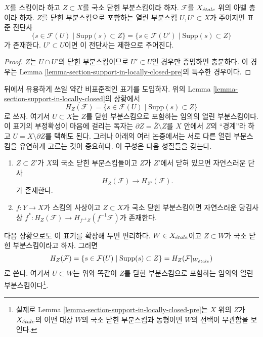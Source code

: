 \begin{lemma}
\label{lemma-section-support-in-locally-closed}
$X$를 스킴이라 하고 $Z \subset X$를 국소 닫힌 부분스킴이라 하자.
$\mathcal{F}$를 $X_{\acute{e}tale}$ 위의 아벨 층이라 하자. $Z$를 닫힌 부분스킴으로
포함하는 열린 부분스킴 $U, U' \subset X$가 주어지면 표준 전단사
$$
\{s \in \mathcal{F}(U) \mid \text{Supp}(s) \subset Z\} =
\{s \in \mathcal{F}(U') \mid \text{Supp}(s) \subset Z\}
$$
가 존재한다. $U' \subset U$이면 이 전단사는 제한으로 주어진다.
\end{lemma}

\begin{proof}
$Z$는 $U \cap U'$의 닫힌 부분스킴이므로 $U' \subset U$인 경우만
증명하면 충분하다. 이 경우는 Lemma
\ref{lemma-section-support-in-locally-closed-pre}의 특수한 경우이다.
\end{proof}

\noindent
뒤에서 유용하게 쓰일 약간 비표준적인 표기를 도입하자. 위의 Lemma
\ref{lemma-section-support-in-locally-closed}의 상황에서
$$
H_Z(\mathcal{F}) = \{s \in \mathcal{F}(U) \mid \text{Supp}(s) \subset Z\}
$$
로 쓰자. 여기서 $U \subset X$는 $Z$를 닫힌 부분스킴으로 포함하는
임의의 열린 부분스킴이다. 이 표기의 부정확성이 마음에 걸리는 독자는
$\partial Z = \overline{Z}\setminus Z$를 $X$ 안에서 $Z$의 ``경계''라 하고
$U = X \setminus \partial Z$를 택해도 된다. 그러나 아래의 여러 논증에서는
서로 다른 열린 부분스킴을 유연하게 고르는 것이 중요하다. 이 구성은 다음
성질들을 갖는다.
\begin{enumerate}
\item
\label{item-inclusion}
$Z \subset Z'$가 $X$의 국소 닫힌 부분스킴들이고 $Z$가 $Z'$에서 닫혀
있으면 자연스러운 단사
$$
H_Z(\mathcal{F}) \to H_{Z'}(\mathcal{F}).
$$
가 존재한다.
\item
\label{item-pullback}
$f : Y \to X$가 스킴의 사상이고 $Z \subset X$가 국소 닫힌 부분스킴이면
자연스러운 당김사상
$f^* : H_Z(\mathcal{F}) \to H_{f^{-1}Z}(f^{-1}\mathcal{F})$가 존재한다.
\end{enumerate}
다음 상황으로도 이 표기를 확장해 두면 편리하다. $W \in X_{\acute{e}tale}$이고
$Z \subset W$가 국소 닫힌 부분스킴이라고 하자. 그러면
$$
H_Z(\mathcal{F}) =
\{s \in \mathcal{F}(U) \mid \text{Supp}(s) \subset Z\} =
H_Z(\mathcal{F}|_{W_{\acute{e}tale}})
$$
로 쓴다. 여기서 $U \subset W$는 위와 똑같이 $Z$를 닫힌 부분스킴으로
포함하는 임의의 열린 부분스킴이다\footnote{실제로 Lemma
\ref{lemma-section-support-in-locally-closed-pre}는 $X$ 위의 $Z$가
$X_{\acute{e}tale}$의 어떤 대상 $W$의 국소 닫힌 부분스킴과 동형이면 $W$의 선택이
무관함을 보인다.}.








